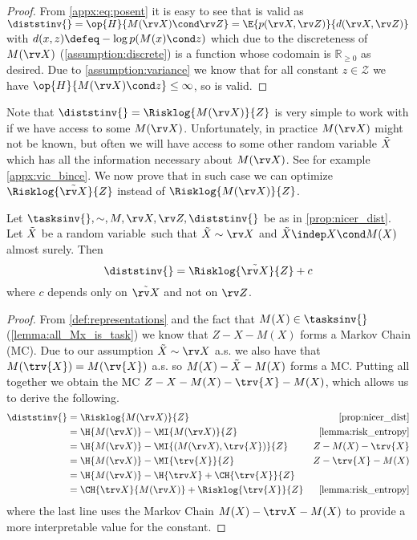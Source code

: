 \documentclass[final]{article}
\begin{document}
\begin{proof}
From \cref{appx:eq:posent} it is easy to see that \disttextinv{} is valid as $\diststinv{}=\op{H}{M(\rv X) \cond \rv Z}=\E{p(\rv X, \rv Z)}{d(\rv X, \rv Z)}$ with $d(x,z) \defeq - \log p(M(x)\cond z)$ which due to the discreteness of $M(\rv X)$ (\cref{assumption:discrete}) is a function whose codomain is $\mathbb{R}_{\geq 0}$ as desired.
Due to \cref{assumption:variance} we know that for all constant $z \in \mathcal{Z}$ we have $\op{H}{M(\rv X) \cond z} \leq \infty$, so \disttextinv{} is valid.
\end{proof}

Note that $\diststinv{} = \Risklog{M(\rv X)}{Z}$ is very simple to work with if we have access to some $M(\rv X)$.
Unfortunately, in practice $M(\rv X)$ might not be known, but often we will have access to some other random variable $\Tilde{X}$ which has all the information necessary about $M(\rv X)$.
See for example \cref{appx:vic_bince}.
We now prove that in such case we can optimize $\Risklog{\Tilde{\rv X}}{Z}$ instead of $\Risklog{M(\rv X)}{Z}$.

\begin{proposition}\label{prop:dist_no_Mx}
Let $\tasksinv{},\sim,M,\rv X,\rv Z,\diststinv{}$ be as in \cref{prop:nicer_dist}.
Let $\Tilde{X}$ be a random variable\ such that $\Tilde{X} \sim \rv X$ and $\Tilde{X} \indep X \cond M(X)$ almost surely. Then
\begin{equation}
\diststinv{} = \Risklog{\Tilde{\rv X}}{Z} + c
\end{equation}
where $c$ depends only on $\Tilde{\rv X}$ and not on $\rv Z$.
\end{proposition}
\begin{proof}
From \cref{def:representations} and the fact that $M(X) \in \tasksinv{}$ (\cref{lemma:all_Mx_is_task}) we know that $Z - X - M(X)$ forms a Markov Chain (MC). 
Due to our assumption 
$\Tilde{X} \sim \rv X$ a.s. we also have that $M(\trv{X}) =M(\rv{X})$ a.s. so $M(X)  - \Tilde{X}  - M(X)$  forms a MC.
Putting all together we obtain the MC $Z - X - M(X) - \trv{X} - M(X)$, which allows us to derive the following.
\begin{align}
\diststinv{} &= \Risklog{M(\rv X)}{Z} & \text{\cref{prop:nicer_dist}} \\
&= \H{M(\rv X)} - \MI{M(\rv X)}{Z} & \text{\cref{lemma:risk_entropy}}  \\
&= \H{M(\rv X)} - \MI{(M(\rv X),\trv{X})}{Z} & Z-M(X)-\trv{X}  \\
&= \H{M(\rv X)} - \MI{\trv{X}}{Z}  & Z-\trv{X}-M(X)  \\
&= \H{M(\rv X)} - \H{\trv X} + \CH{\trv{X}}{Z}  \label{appx:eq:no_Mx_1} \\
&= \CH{\trv X }{M(\rv X)}  +  \Risklog{\trv{X}}{Z}  & \text{\cref{lemma:risk_entropy}} 
\end{align}
where the last line uses the Markov Chain $M(X) -\trv  X- M(X)$ to provide a more interpretable value for the constant.
\end{proof}
\end{document}
